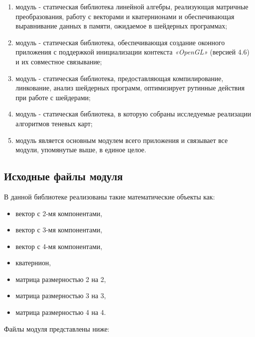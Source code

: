 \begin{enumerate}[label=\arabic*), labelsep=0.5em]
    \item модуль  - статическая библиотека линейной алгебры, реализующая
    матричные преобразования, работу с векторами и кватернионами и обеспечивающая
    выравнивание данных в памяти, ожидаемое в шейдерных программах;
    \item модуль  - статическая библиотека, обеспечивающая создание
    оконного приложения с поддержкой инициализации контекста \textit{«OpenGL»} (версией 4.6)
    и их совместное связывание;
    \item модуль  - статическая библиотека, предоставляющая компилирование, линкование,
    анализ шейдерных программ, оптимизирует рутинные действия при работе с шейдерами;
    \item модуль  - статическая библиотека, в которую собраны исследуемые реализации
    алгоритмов теневых карт;
    \item модуль  является основным модулем всего приложения и связывает все
    модули, упомянутые выше, в единое целое.
\end{enumerate}

\subsection{Исходные файлы модуля }

В данной библиотеке реализованы такие математические объекты как:

\begin{itemize}[label=---]
    \item вектор с 2-мя компонентами,
    \item вектор с 3-мя компонентами,
    \item вектор с 4-мя компонентами,
    \item кватернион,
    \item матрица размерностью 2 на 2,
    \item матрица размерностью 3 на 3,
    \item матрица размерностью 4 на 4.
\end{itemize}

Файлы модуля представлены ниже:

